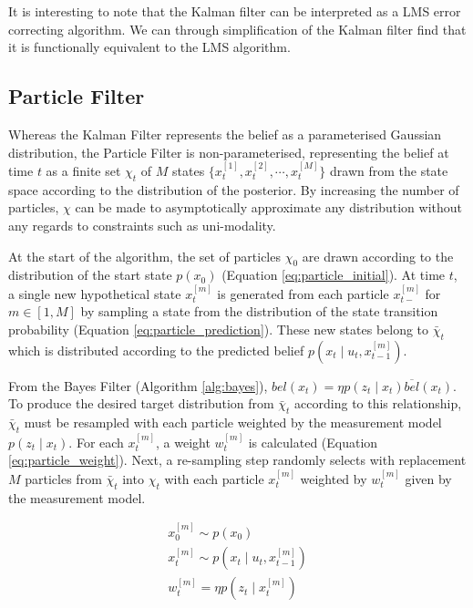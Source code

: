 \documentclass[english]{article}
\begin{document}
It is interesting to note that the Kalman filter can be interpreted as a LMS error correcting algorithm. We can through simplification of the Kalman filter find that it is functionally equivalent to the LMS algorithm.

\subsection{Particle Filter}

Whereas the Kalman Filter represents the belief as a parameterised Gaussian distribution, the Particle Filter is non-parameterised, representing the belief at time $t$ as a finite set $\chi_t$ of $M$ states $\{x^{[1]}_t, x^{[2]}_t, \cdots , x^{[M]}_t\}$ drawn from the state space according to the distribution of the posterior. By increasing the number of particles, $\chi$ can be made to asymptotically approximate any distribution without any regards to constraints such as uni-modality\cite{Thrun02d}.

At the start of the algorithm, the set of particles $\chi_0$ are drawn according to the distribution of the start state $p(x_0)$ (Equation \ref{eq:particle_initial}). At time $t$, a single new hypothetical state $x^{[m]}_t$ is generated from each particle $x^{[m]}_{t-}$ for $m \in [1,M]$ by sampling a state from the distribution of the state transition probability (Equation \ref{eq:particle_prediction}). These new states belong to $\bar{\chi}_t$ which is distributed according to the predicted belief $p(x_t \mid u_t,x^{[m]}_{t-1})$.

From the Bayes Filter (Algorithm \ref{alg:bayes}), $bel(x_t) = \eta p(z_t \mid x_t) \overline{bel}(x_t)$. To produce the desired target distribution from $\bar{\chi}_t$ according to this relationship, $\bar{\chi}_t$ must be resampled with each particle weighted by the measurement model $p(z_t \mid x_t)$. For each $x^{[m]}_{t}$, a weight $w^{[m]}_t$ is calculated (Equation \ref{eq:particle_weight}). Next, a re-sampling step randomly selects with replacement $M$ particles from $\bar{\chi}_t$ into $\chi_t$ with each particle $x^{[m]}_{t}$ weighted by $w^{[m]}_t$ given by the measurement model\cite{probrob}.

\begin {align}
  x^{[m]}_0 \sim  p(x_0) \label{eq:particle_initial}\\
  x^{[m]}_t \sim p(x_t \mid u_t,x^{[m]}_{t-1}) \label{eq:particle_prediction} \\
  w^{[m]}_t = \eta p(z_t \mid x^{[m]}_t) \label{eq:particle_weight}
\end {align}
\end{document}
